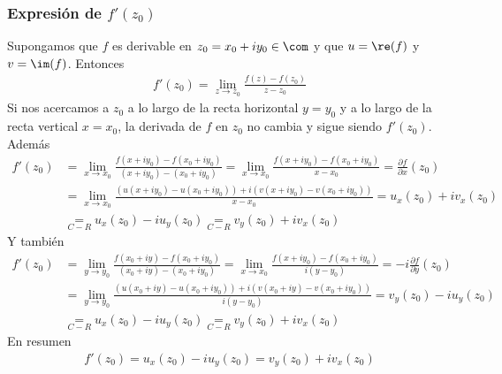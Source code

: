 \subsubsection{Expresión de $f'(z_0)$}
Supongamos que $f$ es derivable en $z_0 = x_0 + iy_0 \in \com$ y que $u = \re(f)$ y $v = \im(f)$. Entonces
\begin{align*}
    f'(z_0) = \lim_{z \to z_0}{\frac{f(z) - f(z_0)}{z -z_0}}
\end{align*}
Si nos acercamos a $z_0$ a lo largo de la recta horizontal $y = y_0$ y a lo largo de la recta vertical $x = x_0$, la derivada de $f$ en $z_0$ no cambia y sigue siendo $f'(z_0)$. Además
\begin{align*}
    f'(z_0) &= \lim_{x \to x_0}{\frac{f(x + iy_0) - f(x_0 + iy_0)}{(x + iy_0) - (x_0 + iy_0)}} = \lim_{x \to x_0}{\frac{f(x + iy_0) - f(x_0 + iy_0)}{x -x_0}} = \frac{\partial f}{\partial x}(z_0) \\
    &= \lim_{x \to x_0}{\frac{(u(x+iy_0) - u(x_0 +iy_0)) + i(v(x + iy_0) - v(x_0 + iy_0))}{x-x_0}} = u_x(z_0) + iv_x(z_0) \\
    & \underset{C-R}{=} u_x(z_0) - iu_y(z_0) \underset{C-R}{=} v_y(z_0) + iv_x(z_0)
\end{align*}
Y también
\begin{align*}
    f'(z_0) &= \lim_{y \to y_0}{\frac{f(x_0 + iy) - f(x_0 + iy_0)}{(x_0 + iy) - (x_0 + iy_0)}} = \lim_{x \to x_0}{\frac{f(x + iy_0) - f(x_0 + iy_0)}{i(y -y_0)}} = -i\frac{\partial f}{\partial y}(z_0) \\
    &= \lim_{y \to y_0}{\frac{(u(x_0+iy) - u(x_0 +iy_0)) + i(v(x_0 + iy) - v(x_0 + iy_0))}{i(y-y_0)}} = v_y(z_0) - iu_y(z_0) \\
    & \underset{C-R}{=} u_x(z_0) - iu_y(z_0) \underset{C-R}{=} v_y(z_0) + iv_x(z_0)
\end{align*}
En resumen
\begin{align*}
\boxed{
    f'(z_0) = u_x(z_0) - iu_y(z_0) = v_y(z_0) + iv_x(z_0)
}
\end{align*}

